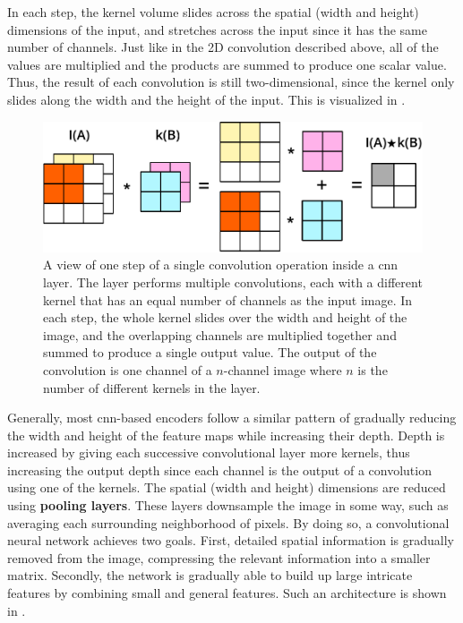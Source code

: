 In each step, the kernel volume slides across the spatial (width and height) dimensions of the input, and stretches across the input since it has the same number of channels. Just like in the 2D convolution described above, all of the values are multiplied and the products are summed to produce one scalar value. Thus, the result of each convolution is still two-dimensional, since the kernel only slides along the width and the height of the input. This is visualized in .

\begin{figure}[h!]
 \centering
 \includegraphics[width=0.8\linewidth]{images/cnn-operation-explained}
 \caption{A view of one step of a single convolution operation inside a \ac{cnn} layer. The layer performs multiple convolutions, each with a different kernel that has an equal number of channels as the input image. In each step, the whole kernel slides over the width and height of the image, and the overlapping channels are multiplied together and summed to produce a single output value. The output of the convolution is one channel of a $n$-channel image where $n$ is the number of different kernels in the layer.}
 \label{fig:cnn-conv-explained}
 \end{figure}

Generally, most \ac{cnn}-based encoders follow a similar pattern of gradually reducing the width and height of the feature maps while increasing their depth. Depth is increased by giving each successive convolutional layer more kernels, thus increasing the output depth since each channel is the output of a convolution using one of the kernels. The spatial (width and height) dimensions are reduced using \textbf{pooling layers}. These layers downsample the image in some way, such as averaging each surrounding neighborhood of pixels. By doing so, a convolutional neural network achieves two goals. First, detailed spatial information is gradually removed from the image, compressing the relevant information into a smaller matrix. Secondly, the network is gradually able to build up large intricate features by combining small and general features. Such an architecture is shown in .

